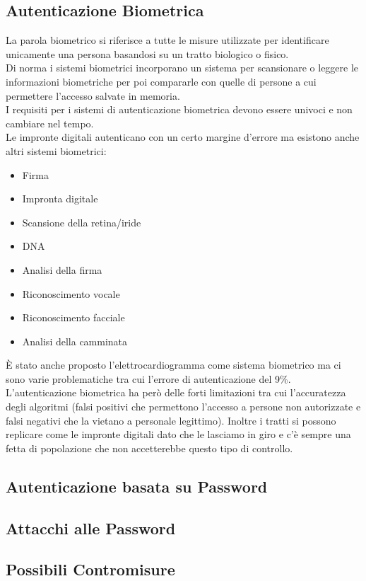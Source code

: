 \subsection{Autenticazione Biometrica}
La parola biometrico si riferisce a tutte le misure utilizzate per identificare unicamente una persona basandosi su un tratto biologico o fisico.\\
Di norma i sistemi biometrici incorporano un sistema per scansionare o leggere le informazioni biometriche per poi compararle con quelle di persone a cui permettere l'accesso salvate in memoria.\\
I requisiti per i sistemi di autenticazione biometrica devono essere univoci e non cambiare nel tempo.\\
Le impronte digitali autenticano con un certo margine d'errore ma esistono anche altri sistemi biometrici:
\begin{itemize}[noitemsep]
    \item Firma
    \item Impronta digitale
    \item Scansione della retina/iride
    \item DNA
    \item Analisi della firma
    \item Riconoscimento vocale
    \item Riconoscimento facciale
    \item Analisi della camminata
\end{itemize}
È stato anche proposto l'elettrocardiogramma come sistema biometrico ma ci sono varie problematiche tra cui l'errore di autenticazione del 9\%.
L'autenticazione biometrica ha però delle forti limitazioni tra cui l'accuratezza degli algoritmi (falsi positivi che permettono l'accesso a persone non autorizzate e falsi negativi che la vietano a personale legittimo).
Inoltre i tratti si possono replicare come le impronte digitali dato che le lasciamo in giro e c'è sempre una fetta di popolazione che non accetterebbe questo tipo di controllo.


\subsection{Autenticazione basata su Password}



\subsection{Attacchi alle Password}



\subsection{Possibili Contromisure}


